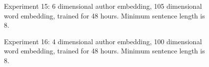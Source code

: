 \documentclass{article}%
\begin{document}
\begin{figure}
\noindent{}
\caption{Experiment 15: 6 dimensional author embedding, 105 dimensional word embedding, trained for 48 hours. Minimum sentence length is 8.}
\end{figure}
\begin{figure}
\noindent{}
\caption{Experiment 16: 4 dimensional author embedding, 100 dimensional word embedding, trained for 48 hours. Minimum sentence length is 8.}
\end{figure}
\end{document}
